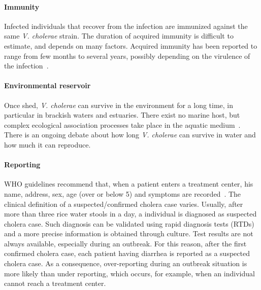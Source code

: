 \paragraph{Immunity} Infected individuals that recover from the infection are immunized against the same \textit{V. cholerae} strain. The duration of acquired immunity is difficult to estimate, and depends on many factors. Acquired immunity has been reported to range from few months to several years, possibly depending on the virulence of the infection~\cite{levine_duration_1981, king_inapparent_2008, kaper_cholera._1995, woodward_cholera_1971, glass_seroepidemiological_1985, clemens_biotype_1991}.

\paragraph{Environmental reservoir} Once shed, \textit{V. cholerae} can survive in the environment for a long time, in particular in brackish waters and estuaries. There exist no marine host, but complex ecological association processes take place in the aquatic medium~\cite{reidl_vibrio_2002, bertuzzo_space-time_2008}. There is an ongoing debate about how long  \textit{V. cholerae} can survive in water and how much it can reproduce.

\paragraph{Reporting} WHO guidelines recommend that, when a patient enters a treatment center, his name, address, sex, age (over or below 5) and symptoms are recorded~\cite{who_first_2010}. The clinical definition of a suspected/confirmed cholera case varies. Usually, after more than three rice water stools in a day, a individual is diagnosed as suspected cholera case. Such diagnosis can be validated using rapid diagnosis tests (RTDs) and a more precise information is obtained through culture. Test results are not always available, especially during an outbreak. For this reason, after the first confirmed cholera case, each patient having diarrhea is reported as a suspected cholera case.  As a consequence, over-reporting during an outbreak situation is more likely than under reporting, which occurs, for example, when an individual cannot reach a treatment center.  %

